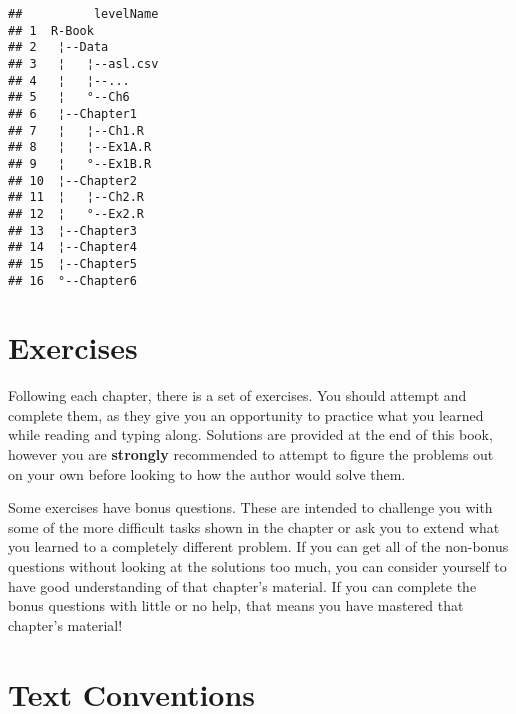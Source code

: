 \documentclass[]{book}
\begin{document}
\begin{verbatim}
##          levelName
## 1  R-Book         
## 2   ¦--Data       
## 3   ¦   ¦--asl.csv
## 4   ¦   ¦--...    
## 5   ¦   °--Ch6    
## 6   ¦--Chapter1   
## 7   ¦   ¦--Ch1.R  
## 8   ¦   ¦--Ex1A.R 
## 9   ¦   °--Ex1B.R 
## 10  ¦--Chapter2   
## 11  ¦   ¦--Ch2.R  
## 12  ¦   °--Ex2.R  
## 13  ¦--Chapter3   
## 14  ¦--Chapter4   
## 15  ¦--Chapter5   
## 16  °--Chapter6
\end{verbatim}

\hypertarget{exercises}{%
\section*{Exercises}\label{exercises}}

Following each chapter, there is a set of exercises. You should attempt and complete them, as they give you an opportunity to practice what you learned while reading and typing along. Solutions are provided at the end of this book, however you are \textbf{strongly} recommended to attempt to figure the problems out on your own before looking to how the author would solve them.

Some exercises have bonus questions. These are intended to challenge you with some of the more difficult tasks shown in the chapter or ask you to extend what you learned to a completely different problem. If you can get all of the non-bonus questions without looking at the solutions too much, you can consider yourself to have good understanding of that chapter's material. If you can complete the bonus questions with little or no help, that means you have mastered that chapter's material!

\hypertarget{notation}{%
\section*{Text Conventions}\label{notation}}
\end{document}
